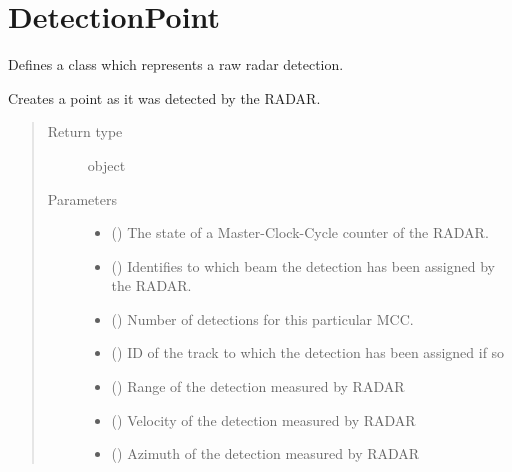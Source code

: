 \documentclass[letterpaper,10pt,english]{sphinxmanual}
\begin{document}
\section{DetectionPoint}
\label{\detokenize{datacontainers:detectionpoint}}
Defines a class which represents a raw radar detection.

\begin{fulllineitems}
\label{\detokenize{datacontainers:data_containers.DetectionPoint}}
Creates a point as it was detected by the RADAR.
\begin{quote}\begin{description}
\item[{Return type}] \leavevmode
object

\item[{Parameters}] \leavevmode\begin{itemize}
\item {} 
 () \textendash{} The state of a Master-Clock-Cycle counter of the RADAR.

\item {} 
 () \textendash{} Identifies to which beam the detection has been assigned by the RADAR.

\item {} 
 () \textendash{} Number of detections for this particular MCC.

\item {} 
 () \textendash{} ID of the track to which the detection has been assigned if so

\item {} 
 () \textendash{} Range of the detection measured by RADAR

\item {} 
 () \textendash{} Velocity of the detection measured by RADAR

\item {} 
 () \textendash{} Azimuth of the detection measured by RADAR


\end{itemize}
\end{description}
\end{quote}
\end{fulllineitems}
\end{document}
